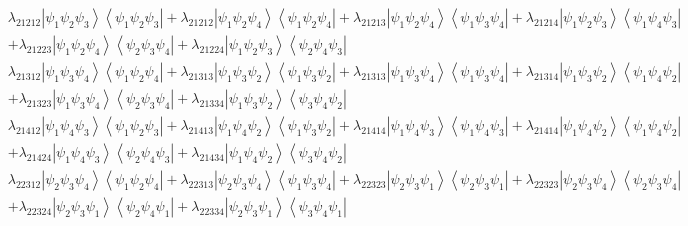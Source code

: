 \documentclass[aps,preprint]{revtex4}%
\begin{document}
\begin{align}
& \lambda_{21212}\left\vert \psi_{1}\psi_{2}\psi_{3}\right\rangle \left\langle
\psi_{1}\psi_{2}\psi_{3}\right\vert +\lambda_{21212}\left\vert \psi_{1}%
\psi_{2}\psi_{4}\right\rangle \left\langle \psi_{1}\psi_{2}\psi_{4}\right\vert
+\lambda_{21213}\left\vert \psi_{1}\psi_{2}\psi_{4}\right\rangle \left\langle
\psi_{1}\psi_{3}\psi_{4}\right\vert +\lambda_{21214}\left\vert \psi_{1}%
\psi_{2}\psi_{3}\right\rangle \left\langle \psi_{1}\psi_{4}\psi_{3}\right\vert
\\
& +\lambda_{21223}\left\vert \psi_{1}\psi_{2}\psi_{4}\right\rangle
\left\langle \psi_{2}\psi_{3}\psi_{4}\right\vert +\lambda_{21224}\left\vert
\psi_{1}\psi_{2}\psi_{3}\right\rangle \left\langle \psi_{2}\psi_{4}\psi
_{3}\right\vert
\end{align}%
\begin{align*}
& \lambda_{21312}\left\vert \psi_{1}\psi_{3}\psi_{4}\right\rangle \left\langle
\psi_{1}\psi_{2}\psi_{4}\right\vert +\lambda_{21313}\left\vert \psi_{1}%
\psi_{3}\psi_{2}\right\rangle \left\langle \psi_{1}\psi_{3}\psi_{2}\right\vert
+\lambda_{21313}\left\vert \psi_{1}\psi_{3}\psi_{4}\right\rangle \left\langle
\psi_{1}\psi_{3}\psi_{4}\right\vert +\lambda_{21314}\left\vert \psi_{1}%
\psi_{3}\psi_{2}\right\rangle \left\langle \psi_{1}\psi_{4}\psi_{2}\right\vert
\\
& +\lambda_{21323}\left\vert \psi_{1}\psi_{3}\psi_{4}\right\rangle
\left\langle \psi_{2}\psi_{3}\psi_{4}\right\vert +\lambda_{21334}\left\vert
\psi_{1}\psi_{3}\psi_{2}\right\rangle \left\langle \psi_{3}\psi_{4}\psi
_{2}\right\vert
\end{align*}%
\begin{align*}
& \lambda_{21412}\left\vert \psi_{1}\psi_{4}\psi_{3}\right\rangle \left\langle
\psi_{1}\psi_{2}\psi_{3}\right\vert +\lambda_{21413}\left\vert \psi_{1}%
\psi_{4}\psi_{2}\right\rangle \left\langle \psi_{1}\psi_{3}\psi_{2}\right\vert
+\lambda_{21414}\left\vert \psi_{1}\psi_{4}\psi_{3}\right\rangle \left\langle
\psi_{1}\psi_{4}\psi_{3}\right\vert +\lambda_{21414}\left\vert \psi_{1}%
\psi_{4}\psi_{2}\right\rangle \left\langle \psi_{1}\psi_{4}\psi_{2}\right\vert
\\
& +\lambda_{21424}\left\vert \psi_{1}\psi_{4}\psi_{3}\right\rangle
\left\langle \psi_{2}\psi_{4}\psi_{3}\right\vert +\lambda_{21434}\left\vert
\psi_{1}\psi_{4}\psi_{2}\right\rangle \left\langle \psi_{3}\psi_{4}\psi
_{2}\right\vert
\end{align*}%
\begin{align*}
& \lambda_{22312}\left\vert \psi_{2}\psi_{3}\psi_{4}\right\rangle \left\langle
\psi_{1}\psi_{2}\psi_{4}\right\vert +\lambda_{22313}\left\vert \psi_{2}%
\psi_{3}\psi_{4}\right\rangle \left\langle \psi_{1}\psi_{3}\psi_{4}\right\vert
+\lambda_{22323}\left\vert \psi_{2}\psi_{3}\psi_{1}\right\rangle \left\langle
\psi_{2}\psi_{3}\psi_{1}\right\vert +\lambda_{22323}\left\vert \psi_{2}%
\psi_{3}\psi_{4}\right\rangle \left\langle \psi_{2}\psi_{3}\psi_{4}\right\vert
\\
& +\lambda_{22324}\left\vert \psi_{2}\psi_{3}\psi_{1}\right\rangle
\left\langle \psi_{2}\psi_{4}\psi_{1}\right\vert +\lambda_{22334}\left\vert
\psi_{2}\psi_{3}\psi_{1}\right\rangle \left\langle \psi_{3}\psi_{4}\psi
_{1}\right\vert
\end{align*}%
\end{document}
